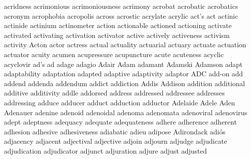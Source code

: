 acridness acrimonious acrimoniousness acrimony acrobat acrobatic acrobatics acronym acrophobia acropolis across acrostic acrylate acrylic act's act actinic actinide actinium actinometer action actionable actioned actioning activate activated activating activation activator active actively activeness activism activity Acton actor actress actual actuality actuarial actuary actuate actuation actuator acuity acumen acupressure acupuncture acute acuteness acyclic acyclovir ad's ad adage adagio Adair Adam adamant Adamski Adamson adapt adaptability adaptation adapted adaptive adaptivity adaptor ADC add-on add addend addenda addendum addict addiction Addis Addison addition additional additive additivity addle addorsed address addressed addressee addresses addressing adduce adducer adduct adduction adductor Adelaide Adele Aden Adenauer adenine adenoid adenoidal adenoma adenomata adenoviral adenovirus adept adeptness adequacy adequate adequateness adhere adherence adherent adhesion adhesive adhesiveness adiabatic adieu adipose Adirondack adiós adjacency adjacent adjectival adjective adjoin adjourn adjudge adjudicate adjudication adjudicator adjunct adjuration adjure adjust adjusted 